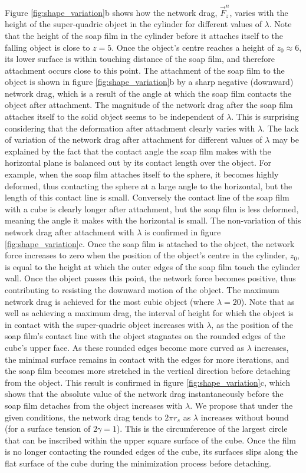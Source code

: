 \documentclass[preprint]{revtex4-1}
\begin{document}
Figure \ref{fig:shape_variation}b shows how the network drag, $\vec{F}^n_z$, varies with the height of the super-quadric object in the cylinder for different values of $\lambda$. Note that the height of the soap film in the cylinder before it attaches itself to the falling object is close to $z=5$. Once the object's centre reaches a height of $z_0\approx 6$, its lower surface is within touching distance of the soap film, and therefore attachment occurs close to this point. The attachment of the soap film to the object is shown in figure \ref{fig:shape_variation}b by a sharp negative (downward) network drag, which is a result of the angle at which the soap film contacts the object after attachment. The magnitude of the network drag after the soap film attaches itself to the solid object seems to be independent of $\lambda$. This is surprising considering that the deformation after attachment clearly varies with $\lambda$. The lack of variation of the network drag after attachment for different values of $\lambda$ may be explained by the fact that the contact angle the soap film makes with the horizontal plane is balanced out by its contact length over the object. For example, when the soap film attaches itself to the sphere, it becomes highly deformed, thus contacting the sphere at a large angle to the horizontal, but the length of this contact line is small. Conversely the contact line of the soap film with a cube is clearly longer after attachment, but the soap film is less deformed, meaning the angle it makes with the horizontal is small. The non-variation of this network drag after attachment with $\lambda$ is confirmed in figure \ref{fig:shape_variation}c. Once the soap film is attached to the object, the network force increases to zero when the position of the object's centre in the cylinder, $z_0$, is equal to the height at which the outer edges of the soap film touch the cylinder wall. Once the object passes this point, the network force becomes positive, thus contributing to resisting the downward motion of the object. The maximum network drag is achieved for the most cubic object (where $\lambda=20$). Note that as well as achieving a maximum drag, the interval of height for which the object is in contact with the super-quadric object increases with $\lambda$, as the position of the soap film's contact line with the object stagnates on the rounded edges of the cube's upper face. As these rounded edges become more curved as $\lambda$ increases, the minimal surface remains in contact with the edges for more iterations, and the soap film becomes more stretched in the vertical direction before detaching from the object. This result is confirmed in figure \ref{fig:shape_variation}c, which shows that the absolute value of the network drag instantaneously before the soap film detaches from the object increases with $\lambda$. We propose that under the given conditions, the network drag tends to $2\pi r_s$ as $\lambda$ increases without bound (for a surface tension of $2\gamma=1$). This is the circumference of the largest circle that can be inscribed within the upper square surface of the cube. Once the film is no longer contacting the rounded edges of the cube, its surfaces slips along the flat surface of the cube during the minimization process before detaching.      
\end{document}
